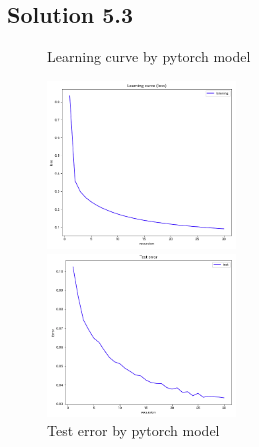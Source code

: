\documentclass[a4paper]{article}
\theoremstyle{definition}
\newenvironment{soln}{
	\leavevmode\color{blue}\ignorespaces
}{}
\begin{document}
	\subsection*{Solution 5.3}	
	\begin{soln}
\begin{figure}[htbp]
\begin{minipage}{0.5\hsize}
\begin{center}
\caption{Learning curve by pytorch model}
\includegraphics[width=50mm]{./img/pytorch_learningcurve.png}
\end{center}
\captionsetup{labelformat=empty}
\end{minipage}
\begin{minipage}{0.5\hsize}
\begin{center}
\caption{Test error by pytorch model}
\includegraphics[width=50mm]{./img/pytorch_testerror.png}
\end{center}
\captionsetup{labelformat=empty}
\end{minipage}
\end{figure}

	\end{soln}
	
	\clearpage
	
\end{document}
